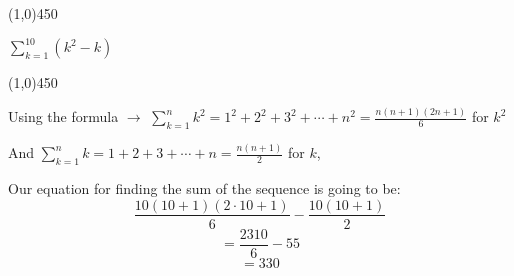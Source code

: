 \documentclass{report}
\begin{document}
\line(1,0){450}

\begin{center}
\begin{large}
$\sum_{k=1}^{10}\left(k^2-k\right)$
\end{large}
\end{center}

\line(1,0){450}

\begin{center}
  Using the formula $\rightarrow$ $\sum_{k=1}^n k^2=1^2+2^2+3^2+\cdots+n^2=\frac{n(n+1)(2 n+1)}{6}$ for $k^2$
  \vspace{3mm}

  And $\sum_{k=1}^n k=1+2+3+\cdots+n=\frac{n(n+1)}{2}$ for $k$,
  \vspace{3mm}

  Our equation for finding the sum of the sequence is going to be:
$$
\frac{10(10+1)(2 \cdot 10+1)}{6}-\frac{10(10+1)}{2}
$$
$$ = \frac{2310}{6} - 55$$
$$ =\boxed{330}$$
\end{center}
\end{document}
